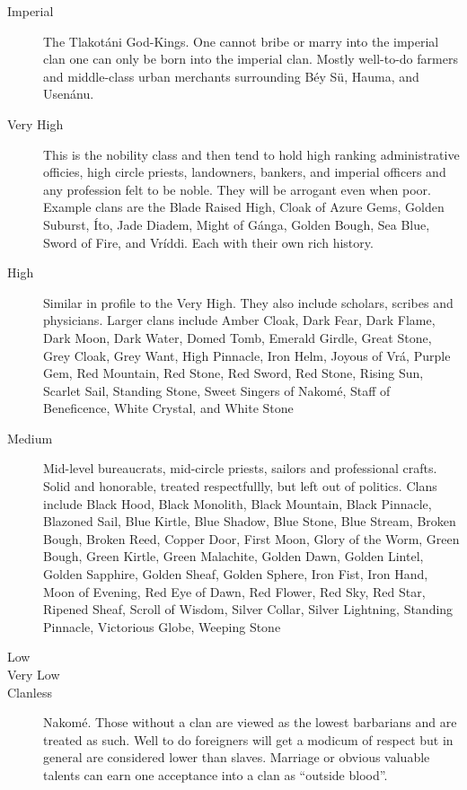 \begin{description}
\item[Imperial] The Tlakot\'ani God-Kings. One cannot bribe or marry into the imperial clan one can only be born into the imperial clan.  Mostly well-to-do farmers and middle-class urban merchants surrounding B\'ey S\"u, Hauma, and Usen\'anu.
\item[Very High] This is the nobility class and then tend to hold high ranking administrative officies, high circle priests, landowners, bankers, and imperial officers and any profession felt to be noble. They will be arrogant even when poor. Example clans are the Blade Raised High, Cloak of Azure Gems, Golden Suburst, \'Ito, Jade Diadem, Might of G\'anga, Golden Bough, Sea Blue, Sword of Fire, and Vr\'iddi. Each with their own rich history.
\item[High] Similar in profile to the Very High. They also include scholars, scribes and physicians. Larger clans include Amber Cloak, Dark Fear, Dark Flame, Dark Moon, Dark Water, Domed Tomb, Emerald Girdle, Great Stone, Grey Cloak, Grey Want, High Pinnacle, Iron Helm, Joyous of Vr\'a, Purple Gem,  Red Mountain, Red Stone, Red Sword, Red Stone, Rising Sun, Scarlet Sail, Standing Stone, Sweet Singers of Nakom\'e, Staff of Beneficence, White Crystal, and White Stone
\item[Medium] Mid-level bureaucrats, mid-circle priests, sailors and professional crafts. Solid and honorable, treated respectfullly, but left out of politics. Clans include Black Hood, Black Monolith, Black Mountain, Black Pinnacle, Blazoned Sail, Blue Kirtle, Blue Shadow, Blue Stone, Blue Stream, Broken Bough, Broken Reed, Copper Door, First Moon, Glory of the Worm, Green Bough, Green Kirtle, Green Malachite, Golden Dawn, Golden Lintel, Golden Sapphire, Golden Sheaf, Golden Sphere, Iron Fist, Iron Hand, Moon of Evening, Red Eye of Dawn, Red Flower, Red Sky, Red Star, Ripened Sheaf, Scroll of Wisdom, Silver Collar, Silver Lightning, Standing Pinnacle, Victorious Globe, Weeping Stone
\item[Low]
\item[Very Low]
\item[Clanless] Nakom\'e. Those without a clan are viewed as the lowest barbarians and are treated as such. Well to do foreigners will get a modicum of respect but in general are considered lower than slaves. Marriage or obvious valuable talents can earn one acceptance into a clan as ``outside blood''. 
\end{description}

